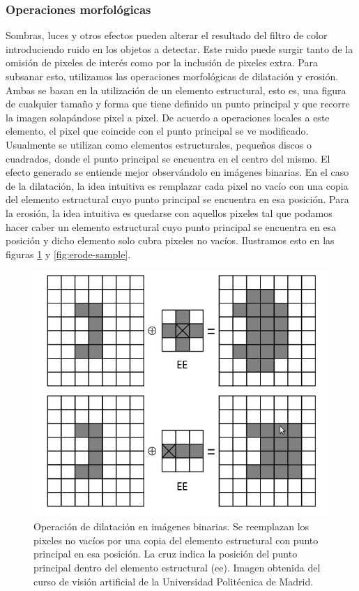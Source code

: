 	\subsubsection{Operaciones morfológicas}
Sombras, luces y otros efectos pueden alterar el resultado del filtro de color introduciendo ruido en los objetos a detectar. Este ruido puede surgir tanto de la omisión de pixeles de interés como por la inclusión de pixeles extra. Para subsanar esto, utilizamos las operaciones morfológicas de dilatación y erosión. Ambas se basan en la utilización de un elemento estructural, esto es, una figura de cualquier tamaño y forma que tiene definido un punto principal y que recorre la imagen solapándose pixel a pixel. De acuerdo a operaciones locales a este elemento, el pixel que coincide con el punto principal se ve modificado. Usualmente se utilizan como elementos estructurales, pequeños discos o cuadrados, donde el punto principal se encuentra en el centro del mismo. El efecto generado se entiende mejor observándolo en imágenes binarias. En el caso de la dilatación, la idea intuitiva es remplazar cada pixel no vacío con una copia del elemento estructural cuyo punto principal se encuentra en esa posición. Para la erosión, la idea intuitiva es quedarse con aquellos pixeles tal que podamos hacer caber un elemento estructural cuyo punto principal se encuentra en esa posición y dicho elemento solo cubra pixeles no vacíos.
Ilustramos esto en las figuras \ref{fig:dilate-sample} y \ref{fig:erode-sample}.


\begin{figure}[tpb]
\begin{center}
  \includegraphics[scale=0.4]{figuras/dilate-sample.png}
\end{center}
  \caption{\small Operación de dilatación en imágenes binarias. Se reemplazan los pixeles no vacíos por una copia del elemento estructural con punto principal en esa posición. La cruz indica la posición del punto principal dentro del elemento estructural (ee). Imagen obtenida del curso de visión artificial de la Universidad Politécnica de Madrid.}
  \label{fig:dilate-sample}
\end{figure}

